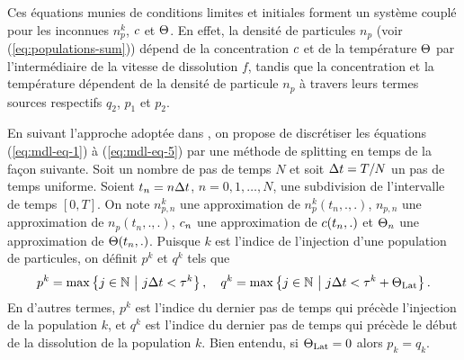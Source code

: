 Ces équations munies de conditions limites et initiales forment un
système couplé pour les inconnues $n_p^k$, $c$ et
$\Theta$. En effet, la densité de particules $n_p$ (voir
(\ref{eq:populations-sum})) dépend de la concentration
$c$ et de la température $\Theta$ par
l'intermédiaire de la vitesse de dissolution $f$, tandis que la
concentration et la température dépendent de la densité de particule
$n_p$ à travers leurs termes sources respectifs $q_2$, $p_1$ et $p_2$.

En suivant l'approche adoptée dans \cite{Hofer2011}, on propose de
discrétiser les équations (\ref{eq:mdl-eq-1}) à (\ref{eq:mdl-eq-5})
par une méthode de splitting en temps de la façon suivante. Soit un
nombre de pas de temps $N$ et soit $\Delta t = T/N$ un pas de temps
uniforme. Soient $t_n = n\Delta t$, $n = 0, 1, \dots, N$, une subdivision
de l'intervalle de temps $[0, T]$. On note $n_{p,n}^k$ une
approximation de $n_p^k(t_n, ., .)$, $n_{p,n}$ une approximation de
$n_p(t_n, ., .)$, $c_n$ une approximation de
$c(t_n, .)$ et $\Theta_n$ une approximation de
$\Theta(t_n, .)$. Puisque $k$ est l'indice de l'injection d'une
population de particules, on définit $p^k$ et $q^k$ tels que
\begin{equation}
  p^k = \max\cparent{j\in \mathbb N\ \middle|\ j\dt < \tau^k}, \quad
  q^k = \max\cparent{j \in \mathbb N\ \middle|\ j\dt < \tau^k + \tlat}.
\end{equation}
En d'autres termes, $p^k$ est l'indice du dernier pas de temps qui précède
l'injection de la population $k$, et $q^k$ est l'indice du dernier pas de temps
qui précède le début de la dissolution de la population $k$. Bien
entendu, si $\Theta_\text{Lat} = 0$ alors $p_k = q_k$.

